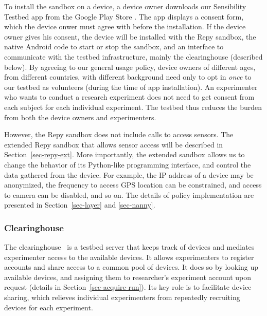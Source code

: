 To install the sandbox on a device, a device owner downloads 
our Sensibility Testbed app from the Google Play Store \cite{sensibility-app}.
The app displays a consent form, which the device onwer must 
agree with before the installation. If the device owner gives his
consent, the device will be installed with the Repy sandbox, the native Android code to 
start or stop the sandbox, and an interface to communicate with the testbed 
infrastructure, mainly the clearinghouse (described below). 
By agreeing to our general usage policy, device 
owners of different ages, from different countries, with different
background need only to opt in \textit{once} to our testbed as 
volunteers (during the time of app installation). An experimenter 
who wants to conduct a research experiment 
does not need to get consent from each subject for each individual
experiment. The testbed thus reduces the burden from both the 
device owners and experimenters. 

However, the Repy sandbox does not include calls to access sensors. 
The extended Repy sandbox that allows sensor access  
will be described in Section~\ref{sec-repy-ext}.
More importantly, the extended sandbox allows us to change the 
behavior of its Python-like programming interface, and control the 
data gathered from the device. 
For example, the IP address of a device may be anonymized, 
the frequency to access GPS location can be constrained, and 
access to camera can be disabled, and so on. 
The details of policy implementation are presented in 
Section~\ref{sec-layer} and \ref{sec-nanny}.

\subsubsection{Clearinghouse}\label{sec-ch}
The clearinghouse~\cite{ch} is a testbed server that keeps 
track of devices and mediates experimenter access to the 
available devices. It allows experimenters to register 
accounts and share access to a common pool of devices.
It does so by looking up available devices, and assigning
them to researcher's experiment account upon request 
(details in Section~\ref{sec-acquire-run}). 
Its key role is to facilitate device sharing, 
which relieves individual experimenters from repeatedly 
recruiting devices for each experiment.

